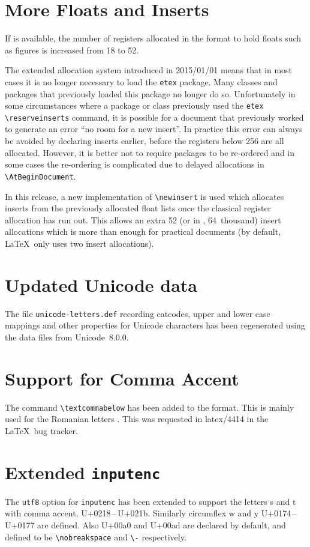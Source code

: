 \documentclass{ltnews}
\providecommand\pkg[1]{\texttt{#1}}
\providecommand\option[1]{\texttt{#1}}
\providecommand\file[1]{\texttt{#1}}
\begin{document}
\section{More Floats and Inserts}
If  is available, the number of registers allocated in
the format to hold floats such as figures is increased from 18 to 52.

The extended allocation system introduced in 2015/01/01 means that in
most cases it is no longer necessary to load the \pkg{etex}
package. Many classes and packages that previously loaded this package
no longer do so. Unfortunately in some circumstances where a package
or class previously used the \pkg{etex} \verb|\reserveinserts|
command, it is possible for a document that previously worked to
generate an error ``no room for a new insert''. In practice this error
can always be avoided by declaring inserts earlier, before the
registers below 256 are all allocated. However, it is better not
to require packages to be re-ordered and in some cases the re-ordering
is complicated due to delayed allocations in \verb|\AtBeginDocument|.

In this release, a new implementation of
\verb|\newinsert| is used which allocates inserts from the previously
allocated float lists once the classical register allocation has run
out. This allows an extra 52 (or in , 64~thousand)
insert allocations which is more than enough for practical documents
(by default, \LaTeX\ only uses two insert allocations).

\section{Updated Unicode data}


The file \file{unicode-letters.def} recording catcodes, upper and
lower case mappings and other properties for Unicode characters has
been regenerated using the data files from Unicode~8.0.0.

\section{Support for Comma Accent}
The command \verb|\textcommabelow| has been added to the format.
This is mainly used for the Romanian letters
.
This was requested in latex/4414 in the \LaTeX\ bug tracker.

\section{Extended \pkg{inputenc}}
The \option{utf8} option for \pkg{inputenc} has been extended to support
the letters s and t with comma accent,
U+0218\,--\,U+021b. Similarly circumflex w and y U+0174\,--\,U+0177 are defined.
Also U+00a0 and U+00ad are declared by default, and defined to be
\verb|\nobreakspace| and \verb|\-| respectively.
\end{document}

